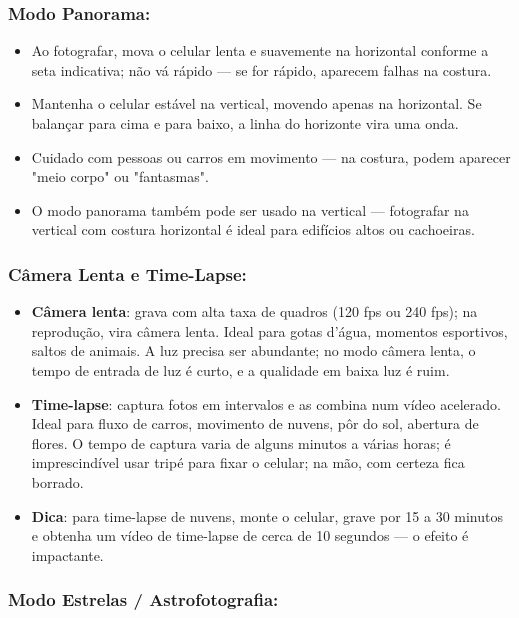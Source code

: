 \subsubsection*{Modo Panorama:}

\begin{itemize}
  \item Ao fotografar, mova o celular lenta e suavemente na horizontal conforme a seta indicativa; não vá rápido — se for rápido, aparecem falhas na costura.
  \item Mantenha o celular estável na vertical, movendo apenas na horizontal. Se balançar para cima e para baixo, a linha do horizonte vira uma onda.
  \item Cuidado com pessoas ou carros em movimento — na costura, podem aparecer "meio corpo" ou "fantasmas".
  \item O modo panorama também pode ser usado na vertical — fotografar na vertical com costura horizontal é ideal para edifícios altos ou cachoeiras.
\end{itemize}

\subsubsection*{Câmera Lenta e Time-Lapse:}

\begin{itemize}
  \item \textbf{Câmera lenta}: grava com alta taxa de quadros (120 fps ou 240 fps); na reprodução, vira câmera lenta. Ideal para gotas d'água, momentos esportivos, saltos de animais. A luz precisa ser abundante; no modo câmera lenta, o tempo de entrada de luz é curto, e a qualidade em baixa luz é ruim.
  \item \textbf{Time-lapse}: captura fotos em intervalos e as combina num vídeo acelerado. Ideal para fluxo de carros, movimento de nuvens, pôr do sol, abertura de flores. O tempo de captura varia de alguns minutos a várias horas; é imprescindível usar tripé para fixar o celular; na mão, com certeza fica borrado.
  \item \textbf{Dica}: para time-lapse de nuvens, monte o celular, grave por 15 a 30 minutos e obtenha um vídeo de time-lapse de cerca de 10 segundos — o efeito é impactante.
\end{itemize}

\subsubsection*{Modo Estrelas / Astrofotografia:}

